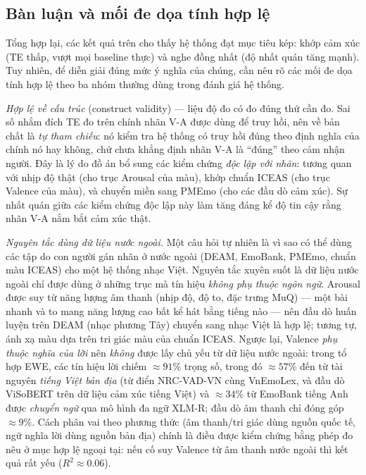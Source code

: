 \documentclass[../DoAn.tex]{subfiles}
\begin{document}
\subsection{Bàn luận và mối đe dọa tính hợp lệ}
\label{subsection:eval-discussion}
Tổng hợp lại, các kết quả trên cho thấy hệ thống đạt mục tiêu kép: khớp cảm xúc (TE thấp, vượt mọi baseline thực) và nghe đồng nhất (độ nhất quán tăng mạnh). Tuy nhiên, để diễn giải đúng mức ý nghĩa của chúng, cần nêu rõ các mối đe dọa tính hợp lệ theo ba nhóm thường dùng trong đánh giá hệ thống.

\textit{Hợp lệ về cấu trúc} (construct validity) --- liệu độ đo có đo đúng thứ cần đo. Sai số nhắm đích TE đo trên chính nhãn V-A được dùng để truy hồi, nên về bản chất là \textit{tự tham chiếu}: nó kiểm tra hệ thống có truy hồi đúng theo định nghĩa của chính nó hay không, chứ chưa khẳng định nhãn V-A là ``đúng'' theo cảm nhận người. Đây là lý do đồ án bổ sung các kiểm chứng \textit{độc lập với nhãn}: tương quan với nhịp độ thật (cho trục Arousal của màu), khớp chuẩn ICEAS (cho trục Valence của màu), và chuyển miền sang PMEmo (cho các đầu dò cảm xúc). Sự nhất quán giữa các kiểm chứng độc lập này làm tăng đáng kể độ tin cậy rằng nhãn V-A nắm bắt cảm xúc thật.

\textit{Nguyên tắc dùng dữ liệu nước ngoài.} Một câu hỏi tự nhiên là vì sao có thể dùng các tập do con người gán nhãn ở nước ngoài (DEAM, EmoBank, PMEmo, chuẩn màu ICEAS) cho một hệ thống nhạc Việt. Nguyên tắc xuyên suốt là dữ liệu nước ngoài chỉ được dùng ở những trục mà tín hiệu \emph{không phụ thuộc ngôn ngữ}. Arousal được suy từ năng lượng âm thanh (nhịp độ, độ to, đặc trưng MuQ) --- một bài nhanh và to mang năng lượng cao bất kể hát bằng tiếng nào --- nên đầu dò huấn luyện trên DEAM (nhạc phương Tây) chuyển sang nhạc Việt là hợp lệ; tương tự, ánh xạ màu dựa trên tri giác màu của chuẩn ICEAS. Ngược lại, Valence \emph{phụ thuộc nghĩa của lời} nên \emph{không} được lấy chủ yếu từ dữ liệu nước ngoài: trong tổ hợp EWE, các tín hiệu lời chiếm $\approx 91\%$ trọng số, trong đó $\approx 57\%$ đến từ tài nguyên \emph{tiếng Việt bản địa} (từ điển NRC-VAD-VN cùng VnEmoLex, và đầu dò ViSoBERT trên dữ liệu cảm xúc tiếng Việt) và $\approx 34\%$ từ EmoBank tiếng Anh được \emph{chuyển ngữ} qua mô hình đa ngữ XLM-R; đầu dò âm thanh chỉ đóng góp $\approx 9\%$. Cách phân vai theo phương thức (âm thanh/tri giác dùng nguồn quốc tế, ngữ nghĩa lời dùng nguồn bản địa) chính là điều được kiểm chứng bằng phép đo nêu ở mục hợp lệ ngoại tại: nếu cố suy Valence từ âm thanh nước ngoài thì kết quả rất yếu ($R^2 \approx 0.06$).
\end{document}
